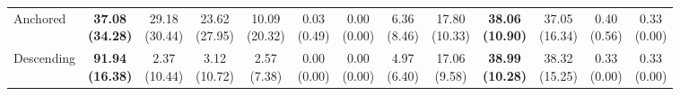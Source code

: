 {\begin{tabular}{l|cccccc|cccccc}
Anchored & \bfseries \makecell{37.08 \\ (34.28)} & \makecell{29.18 \\ (30.44)} & {\cellcolor[HTML]{C8E6C9}} \makecell{23.62 \\ (27.95)} & \makecell{10.09 \\ (20.32)} & \makecell{0.03 \\ (0.49)} & \makecell{0.00 \\ (0.00)} & \makecell{6.36 \\ (8.46)} & \makecell{17.80 \\ (10.33)} & {\cellcolor[HTML]{C8E6C9}} \bfseries \makecell{38.06 \\ (10.90)} & \makecell{37.05 \\ (16.34)} & \makecell{0.40 \\ (0.56)} & \makecell{0.33 \\ (0.00)} \\
Descending & \bfseries \makecell{91.94 \\ (16.38)} & \makecell{2.37 \\ (10.44)} & {\cellcolor[HTML]{C8E6C9}} \makecell{3.12 \\ (10.72)} & \makecell{2.57 \\ (7.38)} & \makecell{0.00 \\ (0.00)} & \makecell{0.00 \\ (0.00)} & \makecell{4.97 \\ (6.40)} & \makecell{17.06 \\ (9.58)} & {\cellcolor[HTML]{C8E6C9}} \bfseries \makecell{38.99 \\ (10.28)} & \makecell{38.32 \\ (15.25)} & \makecell{0.33 \\ (0.00)} & \makecell{0.33 \\ (0.00)} \\
\bottomrule
\end{tabular}
}%
